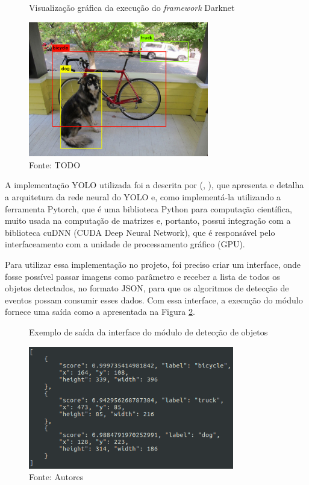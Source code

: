 \documentclass[]{politex}
\begin{document}
\begin{figure}[H]
    \centering
    \caption{Visualização gráfica da execução do \textit{framework} Darknet}
    \includegraphics[width=0.7\textwidth]{dog_yolo.jpg}
    \caption*{Fonte: TODO}
    \label{fig:dog_yolo}
\end{figure}

A implementação YOLO utilizada foi a descrita por (, \citeyear{kathuria}), que apresenta e detalha a arquitetura da rede neural do YOLO e, como implementá-la utilizando a ferramenta Pytorch, que é uma biblioteca Python para computação científica, muito usada na computação de matrizes e, portanto, possui integração com a biblioteca cuDNN (CUDA Deep Neural Network), que é responsável pelo interfaceamento com a unidade de processamento gráfico (GPU).

Para utilizar essa implementação no projeto, foi preciso criar um interface, onde fosse possível passar imagens como parâmetro e receber a lista de todos os objetos detectados, no formato JSON, para que os algoritmos de detecção de eventos possam consumir esses dados. Com essa interface, a execução do módulo fornece uma saída como a apresentada na Figura \ref{fig:interface_objetos}.

\begin{figure}[H]
    \centering
    \caption{Exemplo de saída da interface do módulo de detecção de objetos}
    \includegraphics[width=0.8\textwidth]{interface_detector}
    \caption*{Fonte: Autores}
    \label{fig:interface_objetos}
\end{figure}
\end{document}
